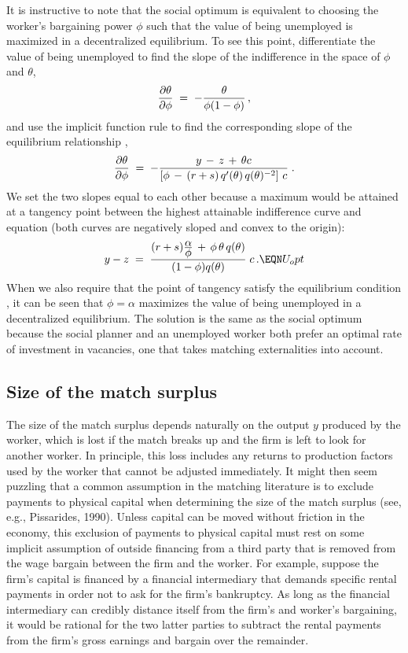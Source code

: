 It is instructive to note that the social optimum is equivalent
to choosing the worker's bargaining power $\phi$ such that the value of
being unemployed is maximized in a decentralized equilibrium. To see
this point, differentiate the value of being unemployed 
to find the slope of the indifference in the space of $\phi$ and
$\theta$,
$$
{ \partial \theta \over \partial \phi} \;=\; - {\theta \over \phi (1-\phi)}\,,
$$
and use the implicit function rule to find the corresponding slope of
the equilibrium relationship ,
$$
{ \partial \theta \over \partial \phi} \;=\; - {y\,-\,z\,+\,\theta c \over
\left[\phi \,-\, (r+s)\, q'(\theta)\, q(\theta)^{-2} \right] \, c }\;.
$$
We set the two slopes equal to each other because a maximum would be
attained at a tangency point between the highest attainable
indifference curve and equation  (both curves are negatively
sloped and convex to the origin):
$$
y-z \;=\; {(r+s) {\displaystyle \alpha \over \displaystyle  \phi}
           \,+\,\phi\,\theta\,q(\theta) \over
                    (1-\phi) q(\theta) } \; c \,.            \EQN U_opt
$$
When we also require that the point of tangency satisfy the
equilibrium condition , it can be seen that
$\phi = \alpha$ maximizes the value of being unemployed in a
decentralized equilibrium. The solution is the same as the
social optimum because the social planner and an unemployed
worker both prefer an optimal rate of investment
in vacancies, one that takes matching externalities into account.

\subsection{Size of the match surplus}
The size of the match surplus depends naturally on the output $y$
produced by the worker, which is lost if the match breaks up and
the firm is left to look for another worker. In principle,
this loss includes any returns to production factors used by the
worker that cannot be adjusted immediately. It might then
seem puzzling that a common assumption in the matching literature
is to exclude payments to physical capital when determining the
size of the match surplus (see, e.g., Pissarides, 1990).
%
Unless capital can be moved without friction in the economy,
this exclusion of payments to physical capital must rest on some
implicit assumption of outside financing from a third party that
is removed from the wage bargain between the firm and the worker.
For example, suppose the firm's capital is financed by a financial
intermediary that demands specific rental payments in order
not to ask for the firm's bankruptcy.
As long as the financial intermediary can credibly distance itself
from the firm's and worker's bargaining, it would be rational for
the two latter parties to subtract the rental payments from the
firm's gross earnings and bargain over the remainder.


